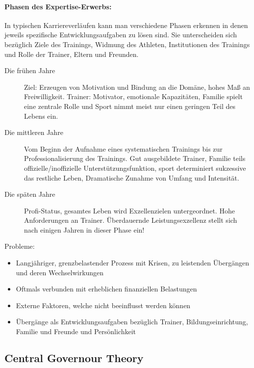 \paragraph{Phasen des Expertise-Erwerbs:}
In typischen Karriereverläufen kann man verschiedene Phasen erkennen in denen jeweils spezifische Entwicklungsaufgaben zu lösen sind. Sie unterscheiden sich bezüglich Ziele des Trainings, Widmung des Athleten, Institutionen des Trainings und Rolle der Trainer, Eltern und Freunden.
\begin{description}
    \item[Die frühen Jahre] Ziel: Erzeugen von Motivation und Bindung an die Domäne, hohes Maß an Freiwilligkeit. Trainer: Motivator, emotionale Kapazitäten, Familie spielt eine zentrale Rolle und Sport nimmt meist nur einen geringen Teil des Lebens ein.
    \item [Die mittleren Jahre] Vom Beginn der Aufnahme eines systematischen Trainings bis zur Professionalisierung des Trainings. Gut ausgebildete Trainer, Familie teils offizielle/inoffizielle Unterstützungsfunktion, sport determiniert sukzessive das restliche Leben, Dramatische Zunahme von Umfang und Intensität.
    \item [Die späten Jahre] Profi-Status, gesamtes Leben wird Exzellenzielen untergeordnet. Hohe Anforderungen an Trainer. Überdauernde Leistungsexzellenz stellt sich nach einigen Jahren in dieser Phase ein!
\end{description}

Probleme:
\begin{itemize}
    \item Langjähriger, grenzbelastender Prozess mit Krisen, zu leistenden Übergängen und deren Wechselwirkungen
    \item Oftmals verbunden mit erheblichen finanziellen Belastungen
    \item Externe Faktoren, welche nicht beeinflusst werden können
    \item Übergänge als Entwicklungsaufgaben bezüglich Trainer, Bildungseinrichtung, Familie und Freunde und Persönlichkeit
\end{itemize}

\subsection{Central Governour Theory}

